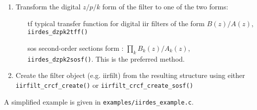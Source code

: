 \begin{enumerate}
\item Transform the digital $z/p/k$ form of the filter to one of the two forms:
    \begin{itemize}
    \item[tf]  typical transfer function for digital iir filters of the form
        $B(z)/A(z)$, {\tt iirdes\_dzpk2tff()}
    \item[sos] second-order sections form : $\prod_k{ B_k(z)/A_k(z) }$, 
        {\tt iirdes\_dzpk2sosf()}.
        This is the preferred method.
    \end{itemize}

\item Create the filter object (e.g. iirfilt) from the resulting
      structure using either {\tt iirfilt\_crcf\_create()} or
      {\tt iirfilt\_crcf\_create\_sosf()}

\end{enumerate}

A simplified example is given in {\tt examples/iirdes\_example.c}.

